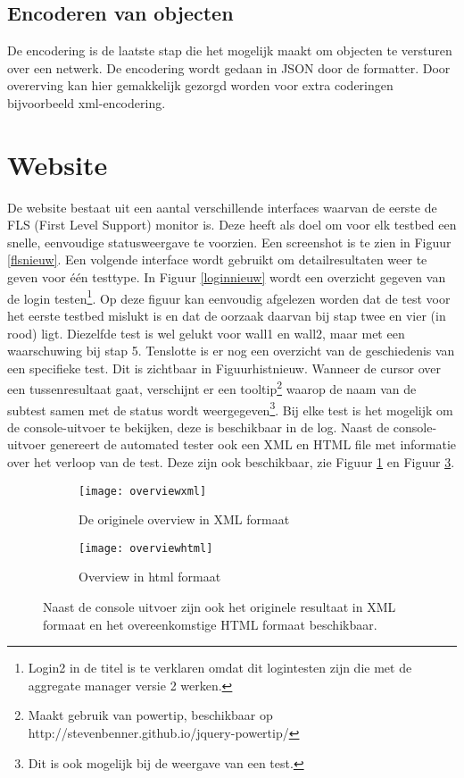 \subsection{Encoderen van objecten}
\npar
De encodering is de laatste stap die het mogelijk maakt om objecten te versturen over een netwerk. De encodering wordt gedaan in JSON door de formatter. Door overerving kan hier gemakkelijk gezorgd worden voor extra coderingen bijvoorbeeld xml-encodering.
\section{Website}
\npar
De website bestaat uit een aantal verschillende interfaces waarvan de eerste de FLS (First Level Support) monitor is. Deze heeft als doel om voor elk testbed een snelle, eenvoudige statusweergave te voorzien. Een screenshot is te zien in Figuur \ref{flsnieuw}.
\clearpage
\npar
Een volgende interface wordt gebruikt om detailresultaten weer te geven voor \'e\'en testtype. In Figuur \ref{loginnieuw} wordt een overzicht gegeven van de login testen\footnote{Login2 in de titel is te verklaren omdat dit logintesten zijn die met de aggregate manager versie 2 werken.}. Op deze figuur kan eenvoudig afgelezen worden dat de test voor het eerste testbed mislukt is en dat de oorzaak daarvan bij stap twee en vier (in rood) ligt. Diezelfde test is wel gelukt voor wall1 en wall2, maar met een waarschuwing bij stap 5.
\npar
Tenslotte is er nog een overzicht van de geschiedenis van een specifieke test. Dit is zichtbaar in Figuur{histnieuw}. Wanneer de cursor over een tussenresultaat gaat, verschijnt er een tooltip\footnote{Maakt gebruik van powertip, beschikbaar op http://stevenbenner.github.io/jquery-powertip/} waarop de naam van de subtest samen met de status wordt weergegeven\footnote{Dit is ook mogelijk bij de weergave van een test.}.
\npar 
Bij elke test is het mogelijk om de console-uitvoer te bekijken, deze is beschikbaar in de log. Naast de console-uitvoer genereert de automated tester ook een XML en HTML file met informatie over het verloop van de test. Deze zijn ook beschikbaar, zie Figuur \ref{overviewxml} en Figuur \ref{overviewhtml}.
\begin{figure}[H]
\centering
\begin{subfigure}{.45\textwidth}
  \centering
  \texttt{[image: overviewxml]}
  \caption{\label{overviewxml} De originele overview in XML formaat}
\end{subfigure}
\begin{subfigure}{.45\textwidth}
  \centering
  \texttt{[image: overviewhtml]}
  \caption{\label{overviewhtml}Overview in html formaat}
\end{subfigure}
\caption{Naast de console uitvoer zijn ook het originele resultaat in XML formaat en het overeenkomstige HTML formaat beschikbaar.}
\end{figure}

